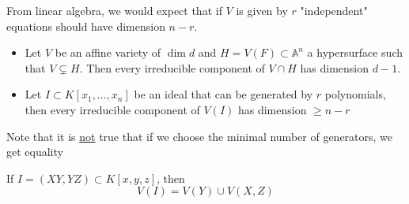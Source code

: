 \documentclass[../main.tex]{subfiles}
\begin{document}
From linear algebra, we would expect that if $V$ is given by $r$ "independent" equations should have dimension $n-r$.
\begin{propo}
	\begin{itemize}
	\item 
	Let $V$ be an affine variety of $\dim d$ and $H = V( F) \subset \mathbb{A}^{n}$ a hypersurface such that $V \subsetneq H$. Then every irreducible component of $V \cap H$ has dimension $d-1$.\\

\item Let $I \subset K[x_1,\ldots,x_n]$ be an ideal that can be generated by $r$ polynomials, then every irreducible component of $V( I) $ has dimension $ \geq n-r$ 

	\end{itemize}
\end{propo}
Note that it is \underline {not} true that if we choose the minimal number of generators, we get equality
\begin{exemple}
	If $ I = ( XY,YZ) \subset K[x,y,z]$, then
	\[ 
	V( I) = V( Y) \cup V( X,Z) 
	\]
	
\end{exemple}
\end{document}
